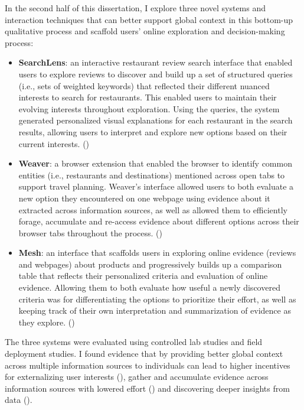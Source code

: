 In the second half of this dissertation, I explore three novel systems and interaction techniques that can better support global context in this bottom-up qualitative process and scaffold users' online exploration and decision-making process:

\begin{itemize}
    \item \textbf{SearchLens}: an interactive restaurant review search interface that enabled users to explore reviews to discover and build up a set of structured queries (i.e., sets of weighted keywords) that reflected their different  nuanced interests to search for restaurants. This enabled users to maintain their evolving interests throughout exploration. Using the queries, the system generated personalized visual explanations for each restaurant in the search results, allowing users to interpret and explore new options based on their current interests. ()

    \item \textbf{Weaver}: a browser extension that enabled the browser to identify common entities (i.e., restaurants and destinations) mentioned across open tabs to support travel planning. Weaver's interface allowed users to both evaluate a new option they encountered on one webpage using evidence about it extracted across information sources, as well as allowed them to efficiently forage, accumulate and re-access evidence about different options across their browser tabs throughout the process. ()

    \item \textbf{Mesh}: an interface that scaffolds users in exploring online evidence (reviews and webpages) about products and progressively builds up a comparison table that reflects their personalized criteria and evaluation of online evidence. Allowing them to both evaluate how useful a newly discovered criteria was for differentiating the options to prioritize their effort, as well as keeping track of their own interpretation and summarization of evidence as they explore. ()
\end{itemize}


The three systems were evaluated using controlled lab studies and field deployment studies. I found evidence that by providing better global context across multiple information sources to individuals can lead to higher incentives for externalizing user interests (), gather and accumulate evidence across information sources with lowered effort () and discovering deeper insights from data ().

